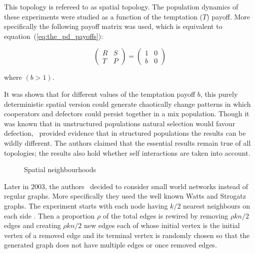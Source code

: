 \documentclass{article}
\theoremstyle{definition}
\begin{document}
This topology is refereed to as spatial topology. The population dynamics of these
experiments were studied as a function of the temptation (\(T\)) payoff.
More specifically the following payoff matrix was used, which is equivalent
to equation~(\ref{eq:the_pd_payoffs}):

\begin{equation}
    \begin{pmatrix}
    R & S \\ T & P
    \end{pmatrix}
    =
    \begin{pmatrix}
        1 & 0 \\ b & 0
    \end{pmatrix}
\end{equation}

where \((b>1)\).

It was shown that for different values of the temptation payoff \(b\), this purely
deterministic spatial version could generate chaotically change patterns in which
cooperators and defectors could persist together in a mix population. 
Though it was known that in unstructured populations natural selection would favour
defection,~\cite{Nowak1992} provided evidence that in structured populations
the results can be wildly different.
The authors claimed that the essential results remain true of all topologies; 
the results also hold whether self interactions are taken into account.

\begin{figure}[!hbtp]
\centering
    \begin{subfigure}{.25\textwidth}
        
    \end{subfigure}
    \begin{subfigure}{.25\textwidth}\centering
        
     \end{subfigure}
     \begin{subfigure}{.25\textwidth}\centering
        
     \end{subfigure}
     \caption{Spatial neighbourhoods}\label{fig:topologies}
    \end{figure}


Later in 2003, the authors~\cite{MASUDA2003} decided to consider small world
networks instead of regular graphs. More specifically they used the well
known Watts and Strogatz~\cite{watts1998} graphs. The experiment starts with each node
having \(k/2\) nearest neighbours on each side
. Then a proportion \(\rho\) of
the total edges is rewired by removing \(\rho kn/2\) edges and creating
\(\rho kn/2\) new edges each of whose initial vertex is the initial vertex of a removed
edge and its terminal vertex is randomly chosen so that the generated graph does
not have multiple edges or once removed edges.
\end{document}
